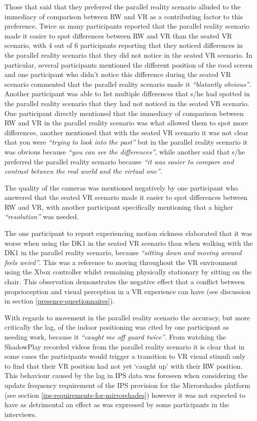 Those that said that they preferred the parallel reality scenario alluded to the immediacy of comparison between RW and VR as a contributing factor to this preference. Twice as many participants reported that the parallel reality scenario made it easier to spot differences between RW and VR than the seated VR scenario, with 4 out of 6 participants reporting that they noticed differences in the parallel reality scenario that they did not notice in the seated VR scenario. In particular, several participants mentioned the different position of the rood screen and one participant who didn't notice this difference during the seated VR scenario commented that the parallel reality scenario made it \textit{``blatantly obvious''}. Another participant was able to list multiple differences that s/he had spotted in the parallel reality scenario that they had not noticed in the seated VR scenario. One participant directly mentioned that the immediacy of comparison between RW and VR in the parallel reality scenario was what allowed them to spot more differences, another mentioned that with the seated VR scenario it was not clear that you were \textit{``trying to look into the past''} but in the parallel reality scenario it was obvious because \textit{``you can see the differences''}, while another said that s/he preferred the parallel reality scenario because \textit{``it was easier to compare and contrast between the real world and the virtual one''}.

The quality of the cameras was mentioned negatively by one participant who answered that the seated VR scenario made it easier to spot differences between RW and VR, with another participant specifically mentioning that a higher \textit{``resolution''} was needed.

The one participant to report experiencing motion sickness elaborated that it was worse when using the DK1 in the seated VR scenario than when walking with the DK1 in the parallel reality scenario, because \textit{``sitting down and moving around feels weird''}. This was a reference to moving throughout the VR environment using the Xbox controller whilst remaining physically stationary by sitting on the chair. This observation demonstrates the negative effect that a conflict between proprioception and visual perception in a VR experience can have (see discussion in section \ref{presence-questionnaires}).

With regards to movement in the parallel reality scenario the accuracy, but more critically the lag, of the indoor positioning was cited by one participant as needing work, because it \textit{``caught me off guard twice''}. From watching the ShadowPlay recorded videos from the parallel reality scenario it is clear that in some cases the participants would trigger a transition to VR visual stimuli only to find that their VR position had not yet `caught up' with their RW position. This behaviour caused by the lag in IPS data was foreseen when considering the update frequency requirement of the IPS provision for the Mirrorshades platform (see section \ref{ips-requirements-for-mirrorshades}) however it was not expected to have as detrimental an effect as was expressed by some participants in the interviews.

